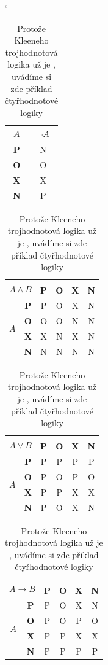 \documentclass[a4paper,11pt]{article}
\begin{document}
\begin{table}[h]
\catcode`
\centering
\begin{tabular}{|c|c|}
\hline
$A$        & $\neg A$       \\\hline
\textbf{P} & \textnormal{N} \\\hline 
\textbf{O} & \textnormal{O} \\\hline
\textbf{X} & \textnormal{X} \\\hline
\textbf{N} & \textnormal{P} \\\hline
\end{tabular}
\begin{tabular}{|c|>{\bfseries}c|c|c|c|c|}
\hline
\multicolumn{2}{|c|}{\multirow{2}{*}{$A \wedge B$}} & \multicolumn{4}{|c|}{$B$} \\
\cline{3-6}
\multicolumn{2}{|c|}{} & \textbf{P} & \textbf{O} & \textbf{X} & \textbf{N} \\
\hline
\multirow{4}{*}{$A$} 
& \textbf{P} & P & O & X & N    \\\cline{2-6}
& \textbf{O} & O & O & N & N    \\\cline {2-6}
& \textbf{X} & X & N & X & N    \\\cline{2-6}
& \textbf{N} & N & N & N & N    \\\cline{2-6}
\hline
\end{tabular}
\begin{tabular}{|c|>{\bfseries}c|c|c|c|c|}
\hline
\multicolumn{2}{|c|}{\multirow{2}{*}{$A \vee B$}} & \multicolumn{4}{|c|}{$B$} \\     \cline{3-6}
\multicolumn{2}{|c|}{} & \textbf{P} & \textbf{O} & \textbf{X} & \textbf{N} \\
\hline
\multirow{4}{*}{$A$}    
& \textbf{P} & P & P & P & P    \\\cline{2-6}
& \textbf{O} & P & O & P & O    \\\cline {2-6}
& \textbf{X} & P & P & X & X    \\\cline{2-6}
& \textbf{N} & P & O & X & N    \\\cline{2-6}
\hline
\end{tabular}
\begin{tabular}{|c|>{\bfseries}c|c|c|c|c|}
\hline
\multicolumn{2}{|c|}{\multirow{2}{*}{$A \to B$}} & \multicolumn{4}{|c|}{$B$} \\     \cline{3-6}
\multicolumn{2}{|c|}{} & \textbf{P} & \textbf{O} & \textbf{X} & \textbf{N} \\
\hline
\multirow{4}{*}{$A$}    
& \textbf{P} & P & O & X & N    \\\cline{2-6}
& \textbf{O} & P & O & P & O    \\\cline {2-6}
& \textbf{X} & P & P & X & X    \\\cline{2-6}
& \textbf{N} & P & P & P & P    \\\cline{2-6}
\hline
\end{tabular}
\caption{Protože Kleeneho trojhodnotová logika už je , uvádíme si zde příklad čtyřhodnotové logiky}
\label{tab2}
\end{table}
\bigskip
\pagebreak
\end{document}
